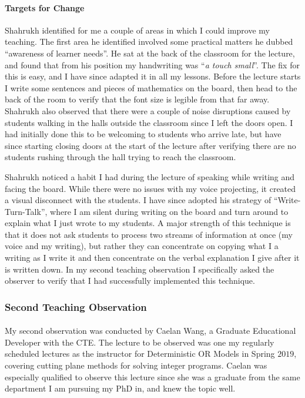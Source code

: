 \documentclass{article}
\begin{document}
\paragraph{Targets for Change} Shahrukh identified for me a couple of areas in which I could improve my teaching. The first area he identified involved some practical matters he dubbed ``awareness of learner needs''. He sat at the back of the classroom for the lecture, and found that from his position my handwriting was ``\emph{a touch small}''. The fix for this is easy, and I have since adapted it in all my lessons. Before the lecture starts I write some sentences and pieces of mathematics on the board, then head to the back of the room to verify that the font size is legible from that far away. Shahrukh also observed that there were a couple of noise disruptions caused by students walking in the halls outside the classroom since I left the doors open. I had initially done this to be welcoming to students who arrive late, but have since starting closing doors at the start of the lecture after verifying there are no students rushing through the hall trying to reach the classroom.

Shahrukh noticed a habit I had during the lecture of speaking while writing and facing the board. While there were no issues with my voice projecting, it created a visual disconnect with the students. I have since adopted his strategy of ``Write-Turn-Talk'', where I am silent during writing on the board and turn around to explain what I just wrote to my students. A major strength of this technique is that it does not ask students to process two streams of information at once (my voice and my writing), but rather they can concentrate on copying what I a writing as I write it and then concentrate on the verbal explanation I give after it is written down. In my second teaching observation I specifically asked the observer to verify that I had successfully implemented this technique.

\subsubsection*{Second Teaching Observation}
\paragraph{}My second observation was conducted by Caelan Wang, a Graduate Educational Developer with the CTE. The lecture to be observed was one my regularly scheduled lectures as the instructor for Deterministic OR Models in Spring $2019$, covering cutting plane methods for solving integer programs. Caelan was especially qualified to observe this lecture since she was a graduate from the same department I am pursuing my PhD in, and knew the topic well.
\end{document}
